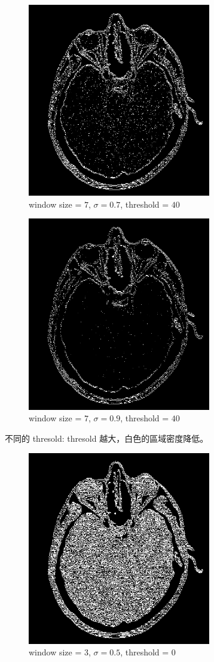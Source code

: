 \documentclass[conference]{IEEEtran}
\begin{document}
\begin{figure}[H]
\centerline{\includegraphics[width=8cm]{headCT07.png}}
\caption{window size = $7$, $\sigma=0.7$,  threshold = $40$}
\label{headCT07}
\end{figure}

\begin{figure}[H]
\centerline{\includegraphics[width=8cm]{headCT08.png}}
\caption{window size = $7$, $\sigma=0.9$,  threshold = $40$}
\label{headCT08}
\end{figure}

不同的 thresold: thresold 越大，白色的區域密度降低。

\begin{figure}[H]
\centerline{\includegraphics[width=8cm]{headCT09.png}}
\caption{window size = $3$, $\sigma=0.5$,  threshold = $0$}
\label{headCT9}
\end{figure}
\end{document}
